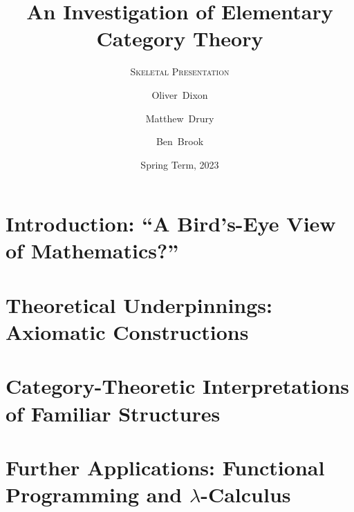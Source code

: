 \documentclass{beamer}
\title[Elementary Category Theory]%
{An Investigation of Elementary Category Theory}
\subtitle{\fontfamily{lmr}\textsc{Skeletal Presentation}}
\author[Dixon, Drury \& Brook]%
{Oliver~Dixon \and Matthew~Drury \and Ben~Brook}
\institute[]{Department of Mathematics, University of York}
\date{Spring Term, 2023}
\begin{document}
\frame{\titlepage}
\section{Introduction: ``A Bird's-Eye View of Mathematics?''}
\section{Theoretical Underpinnings: Axiomatic Constructions}
\section{Category-Theoretic Interpretations of Familiar Structures}
\section{Further Applications: Functional Programming and %
        \texorpdfstring{$\lambda$}{Lambda}-Calculus}
\end{document}
